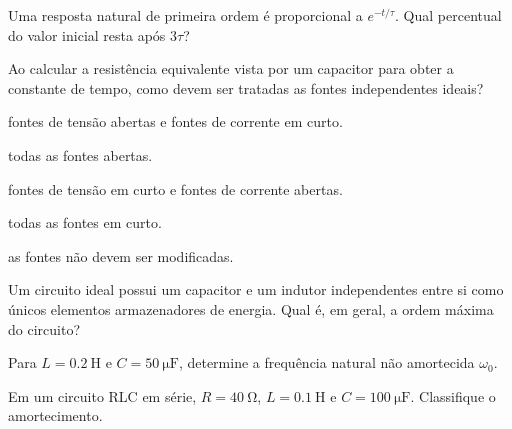 \begin{questao}[1]{}
Uma resposta natural de primeira ordem é proporcional a $e^{-t/\tau}$. Qual
percentual do valor inicial resta após $3\tau$?
\end{questao}

\begin{questao}[1]{}
Ao calcular a resistência equivalente vista por um capacitor para obter a
constante de tempo, como devem ser tratadas as fontes independentes ideais?
\begin{alternativas}
\item fontes de tensão abertas e fontes de corrente em curto.
\item todas as fontes abertas.
\item fontes de tensão em curto e fontes de corrente abertas.
\item todas as fontes em curto.
\item as fontes não devem ser modificadas.
\end{alternativas}
\end{questao}

\begin{questao}[1]{}
Um circuito ideal possui um capacitor e um indutor independentes entre si como
únicos elementos armazenadores de energia. Qual é, em geral, a ordem máxima do
circuito?
\end{questao}

\begin{questao}[1]{}
Para $L=\SI{0.2}{\henry}$ e $C=\SI{50}{\micro\farad}$, determine a frequência
natural não amortecida $\omega_0$.
\end{questao}

\begin{questao}[1]{}
Em um circuito RLC em série, $R=\SI{40}{\ohm}$, $L=\SI{0.1}{\henry}$ e
$C=\SI{100}{\micro\farad}$. Classifique o amortecimento.
\end{questao}

